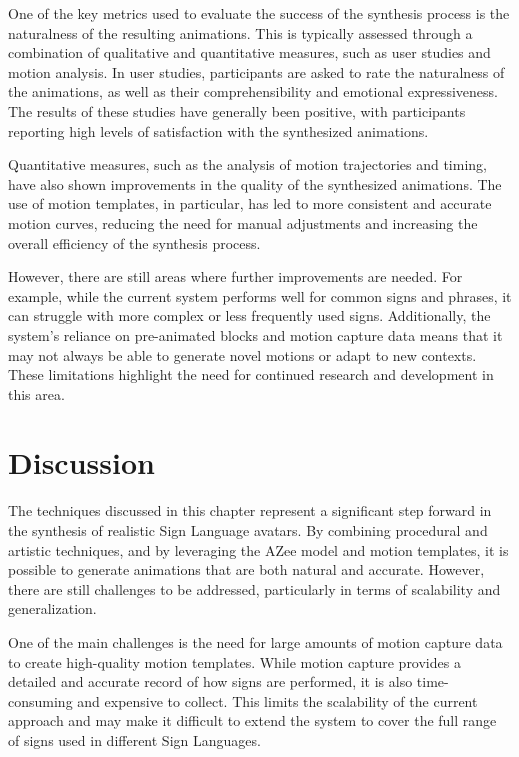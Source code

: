 \documentclass[../../main.tex]{subfiles}
\begin{document}
One of the key metrics used to evaluate the success of the synthesis process is the naturalness of the resulting animations. This is typically assessed through a combination of qualitative and quantitative measures, such as user studies and motion analysis. In user studies, participants are asked to rate the naturalness of the animations, as well as their comprehensibility and emotional expressiveness. The results of these studies have generally been positive, with participants reporting high levels of satisfaction with the synthesized animations.

Quantitative measures, such as the analysis of motion trajectories and timing, have also shown improvements in the quality of the synthesized animations. The use of motion templates, in particular, has led to more consistent and accurate motion curves, reducing the need for manual adjustments and increasing the overall efficiency of the synthesis process.

However, there are still areas where further improvements are needed. For example, while the current system performs well for common signs and phrases, it can struggle with more complex or less frequently used signs. Additionally, the system's reliance on pre-animated blocks and motion capture data means that it may not always be able to generate novel motions or adapt to new contexts. These limitations highlight the need for continued research and development in this area.

\section{Discussion}
\label{ch:intermediate_blocks:discussion}

The techniques discussed in this chapter represent a significant step forward in the synthesis of realistic Sign Language avatars. By combining procedural and artistic techniques, and by leveraging the AZee model and motion templates, it is possible to generate animations that are both natural and accurate. However, there are still challenges to be addressed, particularly in terms of scalability and generalization.

One of the main challenges is the need for large amounts of motion capture data to create high-quality motion templates. While motion capture provides a detailed and accurate record of how signs are performed, it is also time-consuming and expensive to collect. This limits the scalability of the current approach and may make it difficult to extend the system to cover the full range of signs used in different Sign Languages.
\end{document}

